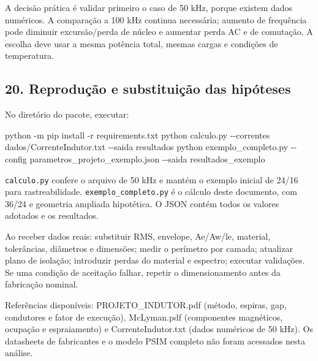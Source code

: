 \documentclass[
]{article}
\newenvironment{Shaded}{\begin{snugshade}}{\end{snugshade}}
\newcommand{\AttributeTok}[1]{\textcolor[rgb]{0.13,0.29,0.53}{#1}}
\newcommand{\ExtensionTok}[1]{#1}
\newcommand{\NormalTok}[1]{#1}
\begin{document}
A decisão prática é validar primeiro o caso de 50 kHz, porque existem
dados numéricos. A comparação a 100 kHz continua necessária; aumento de
frequência pode diminuir excursão/perda de núcleo e aumentar perda AC e
de comutação. A escolha deve usar a mesma potência total, mesmas cargas
e condições de temperatura.

\subsection{20. Reprodução e substituição das
hipóteses}\label{reproduuxe7uxe3o-e-substituiuxe7uxe3o-das-hipuxf3teses}

No diretório do pacote, executar:

\begin{Shaded}
\begin{Highlighting}[]
\ExtensionTok{python} \AttributeTok{{-}m}\NormalTok{ pip install }\AttributeTok{{-}r}\NormalTok{ requirements.txt}
\ExtensionTok{python}\NormalTok{ calculo.py }\AttributeTok{{-}{-}correntes}\NormalTok{ dados/CorrenteIndutor.txt }\AttributeTok{{-}{-}saida}\NormalTok{ resultados}
\ExtensionTok{python}\NormalTok{ exemplo\_completo.py }\AttributeTok{{-}{-}config}\NormalTok{ parametros\_projeto\_exemplo.json }\AttributeTok{{-}{-}saida}\NormalTok{ resultados\_exemplo}
\end{Highlighting}
\end{Shaded}

\texttt{calculo.py} confere o arquivo de 50 kHz e mantém o exemplo
inicial de 24/16 para rastreabilidade. \texttt{exemplo\_completo.py} é o
cálculo deste documento, com 36/24 e geometria ampliada hipotética. O
JSON contém todos os valores adotados e os resultados.

Ao receber dados reais: substituir RMS, envelope, Ae/Aw/le, material,
tolerâncias, diâmetros e dimensões; medir o perímetro por camada;
atualizar plano de isolação; introduzir perdas do material e espectro;
executar validações. Se uma condição de aceitação falhar, repetir o
dimensionamento antes da fabricação nominal.

Referências disponíveis: PROJETO\_INDUTOR.pdf (método, espiras, gap,
condutores e fator de execução), McLyman.pdf (componentes magnéticos,
ocupação e espraiamento) e CorrenteIndutor.txt (dados numéricos de 50
kHz). Os datasheets de fabricantes e o modelo PSIM completo não foram
acessados nesta análise.
\end{document}
